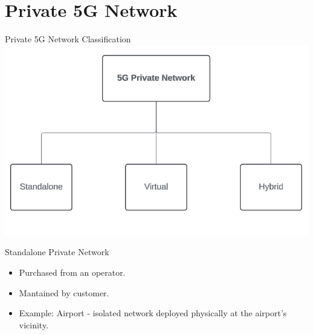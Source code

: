 \documentclass{beamer}
\begin{document}



\section[Private 5G Network]{Private 5G Network}

\begin{frame}{Private 5G Network Classification}
  \hspace*{0.6em}
  \includegraphics[scale=0.6]{fig/5gprivate.png}
\end{frame}


\begin{frame}{Standalone Private Network}
  \vspace*{1.6em}
  \begin{itemize}
    \item Purchased from an operator.
    \vspace*{0.75em}
    \item Mantained by customer.
    \vspace*{0.75em}
    \item Example: Airport - isolated network deployed physically at the airport's vicinity.
  \end{itemize}
\end{frame}
\end{document}
